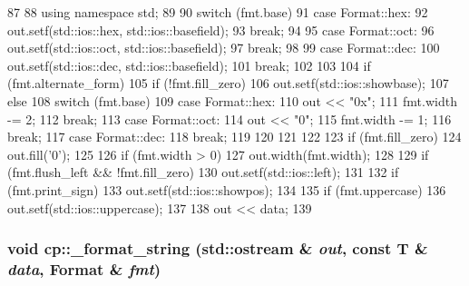 \begin{DoxyCode}
87 {
88     using namespace std;
89 
90     switch (fmt.base) {
91       case Format::hex:
92         out.setf(std::ios::hex, std::ios::basefield);
93         break;
94 
95       case Format::oct:
96         out.setf(std::ios::oct, std::ios::basefield);
97         break;
98 
99       case Format::dec:
100         out.setf(std::ios::dec, std::ios::basefield);
101         break;
102     }
103 
104     if (fmt.alternate_form) {
105         if (!fmt.fill_zero)
106             out.setf(std::ios::showbase);
107         else {
108             switch (fmt.base) {
109               case Format::hex:
110                 out << "0x";
111                 fmt.width -= 2;
112                 break;
113               case Format::oct:
114                 out << "0";
115                 fmt.width -= 1;
116                 break;
117               case Format::dec:
118                 break;
119             }
120         }
121     }
122 
123     if (fmt.fill_zero)
124         out.fill('0');
125 
126     if (fmt.width > 0)
127         out.width(fmt.width);
128 
129     if (fmt.flush_left && !fmt.fill_zero)
130         out.setf(std::ios::left);
131 
132     if (fmt.print_sign)
133         out.setf(std::ios::showpos);
134 
135     if (fmt.uppercase)
136         out.setf(std::ios::uppercase);
137 
138     out << data;
139 }
\end{DoxyCode}
\hypertarget{namespacecp_a9c55f61eeac5536687ef506f543968de}{
\subsubsection[{\_\-format\_\-string}]{\setlength{\rightskip}{0pt plus 5cm}void cp::\_\-format\_\-string (std::ostream \& {\em out}, \/  const T \& {\em data}, \/  Format \& {\em fmt})}}
\label{namespacecp_a9c55f61eeac5536687ef506f543968de}




